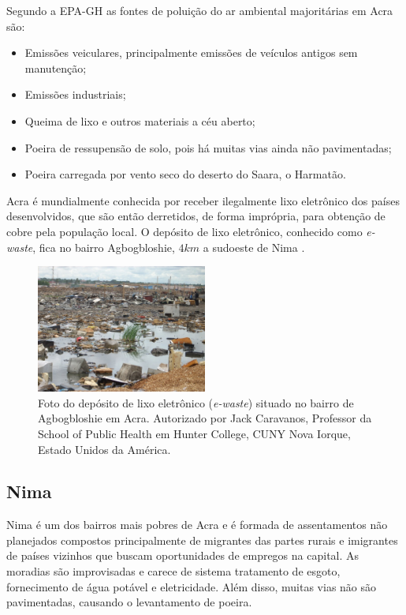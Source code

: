 Segundo a EPA-GH \citep{epa2015} as fontes de poluição do ar ambiental 
majoritárias em Acra são:

\begin{itemize}
 \item Emissões veiculares, principalmente emissões de veículos antigos sem 
       manutenção;
 \item Emissões industriais;
 \item Queima de lixo e outros materiais a céu aberto;
 \item Poeira de ressupensão de solo, pois há muitas vias ainda não pavimentadas;
 \item Poeira carregada por vento seco do deserto do Saara, o Harmatão.
\end{itemize}

Acra é mundialmente conhecida por receber ilegalmente lixo 
eletrônico dos países desenvolvidos, que são então derretidos, de forma
imprópria, para obtenção de cobre pela população local. 
O depósito de lixo eletrônico, conhecido como \textit{e-waste}, 
fica no bairro Agbogbloshie, $4 km$ a sudoeste de Nima
\citep{asampong2015}.

\begin{figure}[H]
  \centering
  \includegraphics[width=0.5\textwidth]{../inputs/images/ewaste_jack_caravano.jpg}
  \caption{Foto do depósito de lixo eletrônico (\textit{e-waste}) situado no bairro 
           de Agbogbloshie em Acra. Autorizado por Jack Caravanos, 
           Professor da School of Public Health em Hunter College, CUNY
           Nova Iorque, Estado Unidos da América. \label{fig:ewaste}}
\end{figure}

\subsection{Nima}

Nima é um dos bairros mais pobres de Acra e é formada de assentamentos não 
planejados compostos principalmente de migrantes das partes rurais e 
imigrantes de países vizinhos que buscam oportunidades de empregos na capital. 
As moradias são improvisadas e carece de sistema tratamento de esgoto, 
fornecimento de água potável e eletricidade. Além disso, muitas vias não são 
pavimentadas, causando o levantamento de poeira. 

